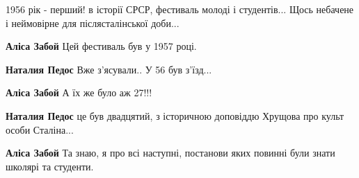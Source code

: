  
 
 
 
 


1956 рік - перший! в історії СРСР, фестиваль молоді і студентів... Щось
небачене і неймовірне для післясталінської доби...

\textbf{Аліса Забой} Цей фестиваль був у 1957 році.

\textbf{Наталия Педос} Вже з'ясували..
У 56 був з'їзд...

\textbf{Аліса Забой} А їх же було аж 27!!!

\textbf{Наталия Педос} це був двадцятий, з історичною доповіддю Хрущова про культ особи Сталіна...

\textbf{Аліса Забой} Та знаю, я про всі наступні, постанови яких повинні були знати школярі та студенти.
